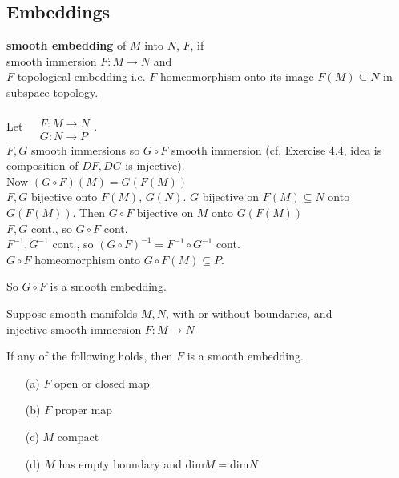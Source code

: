 \subsection*{Embeddings}

\begin{definition}
\textbf{smooth embedding} of $M$ into $N$, $F$, if \\
\phantom{ \quad \, } smooth immersion $F: M\to N$ and \\
\phantom{ \quad \quad \, } $F$ topological embedding i.e. $F$ homeomorphism onto its image $F(M) \subseteq N$ in subspace topology.  

\end{definition}


Let $\begin{aligned} & \quad \\
    & F : M \to N \\
    & G:N \to P \end{aligned}$.  \\
$F,G$ smooth immersions so $G\circ F$ smooth immersion (cf. Exercise 4.4, idea is composition of $DF, DG$ is injective).  \\
Now $(G \circ F)(M) = G(F(M))$ \\
$F,G$ bijective onto $F(M)$, $G(N)$.  $G$ bijective on $F(M) \subseteq N$ onto $G(F(M))$.  Then $G\circ F$ bijective on $M$ onto $G(F(M))$ \\
$F,G$ cont., so $G\circ F $ cont.  \\
$F^{-1},G^{-1}$ cont., so $(G\circ F)^{-1}= F^{-1} \circ G^{-1}$ cont.  \\
$G\circ F$ homeomorphism onto $G\circ F(M) \subseteq P$.  

So $G\circ F$ is a smooth embedding.  


\begin{proposition}[4.22]
        Suppose smooth manifolds $M,N$, with or without boundaries, and \\
injective smooth immersion $F:M\to N$

If any of the following holds, then $F$ is a smooth embedding. 
\begin{enumerate}
        \item[(a)] $F$ open or closed map
        \item[(b)] $F$ proper map
        \item[(c)] $M$ compact
        \item[(d)] $M$ has empty boundary and $\text{dim}M = \text{dim}N$
\end{enumerate}
\end{proposition}
